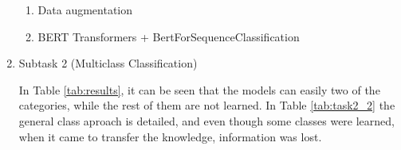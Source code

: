 \documentclass[11pt]{article}
\begin{document}
\begin{enumerate}
\begin{enumerate}
		      \item Data augmentation


		      \item BERT Transformers + BertForSequenceClassification

	      \end{enumerate}

	\item Subtask 2 (Multiclass Classification)

	      In Table \ref{tab:results}, it can be seen that the models can easily two of the categories,
	      while the rest of them are not learned. In Table \ref{tab:task2_2} the general class aproach is detailed, and
	      even though some classes were learned, when it came to transfer the knowledge, information
	      was lost.

\end{enumerate}
\end{document}
